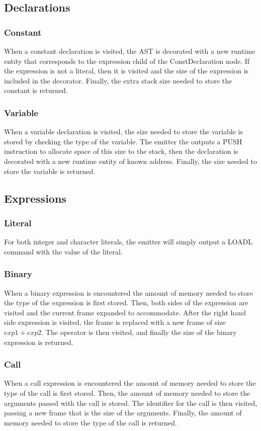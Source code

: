 \documentclass{article}
\begin{document}
\subsection{Declarations}
\subsubsection{Constant}
When a constant declaration is visited, the AST is decorated with a new runtime entity that corresponds to the expression child of the ConstDeclaration node. If the expression is not a literal, then it is visited and the size of the expression is included in the decorator. Finally, the extra stack size needed to store the constant is returned.

\subsubsection{Variable}
When a variable declaration is visited, the size needed to store the variable is stored by checking the type of the variable. The emitter the outputs a PUSH instruction to allocate space of this size to the stack, then the declaration is decorated with a new runtime entity of known address. Finally, the size needed to store the variable is returned.

\subsection{Expressions}
\subsubsection{Literal}
For both integer and character literals, the emitter will simply output a LOADL command with the value of the literal.

\subsubsection{Binary}
When a binary expression is encountered the amount of memory needed to store the type of the expression is first stored. Then, both sides of the expression are visited and the current frame expanded to accommodate. After the right hand side expression is visited, the frame is replaced with a new frame of size $exp1 + exp2$. The operator is then visited, and finally the size of the binary expression is returned.

\subsubsection{Call}
When a call expression is encountered the amount of memory needed to store the type of the call is first stored. Then, the amount of memory needed to store the arguments passed with the call is stored. The identifier for the call is then visited, passing a new frame that is the size of the arguments. Finally, the amount of memory needed to store the type of the call is returned.
\end{document}
